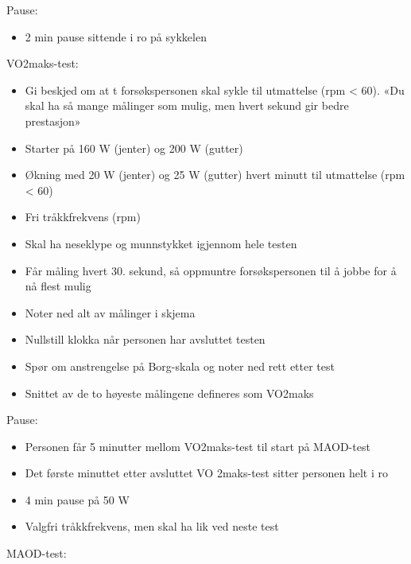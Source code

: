 \documentclass[
  letterpaper,
  DIV=11,
  numbers=noendperiod]{scrartcl}
\providecommand{\tightlist}{%
  \setlength{\itemsep}{0pt}\setlength{\parskip}{0pt}}\usepackage{longtable,booktabs,array}
\begin{document}
Pause:

\begin{itemize}
\tightlist
\item
  2 min pause sittende i ro på sykkelen
\end{itemize}

VO2maks-test:

\begin{itemize}
\tightlist
\item
  Gi beskjed om at t forsøkspersonen skal sykle til utmattelse (rpm
  \textless{} 60). «Du skal ha så mange målinger som mulig, men hvert
  sekund gir bedre prestasjon»
\item
  Starter på 160 W (jenter) og 200 W (gutter)
\item
  Økning med 20 W (jenter) og 25 W (gutter) hvert minutt til utmattelse
  (rpm \textless{} 60)
\item
  Fri tråkkfrekvens (rpm)
\item
  Skal ha neseklype og munnstykket igjennom hele testen
\item
  Får måling hvert 30. sekund, så oppmuntre forsøkspersonen til å jobbe
  for å nå flest mulig
\item
  Noter ned alt av målinger i skjema
\item
  Nullstill klokka når personen har avsluttet testen
\item
  Spør om anstrengelse på Borg-skala og noter ned rett etter test
\item
  Snittet av de to høyeste målingene defineres som VO2maks
\end{itemize}

Pause:

\begin{itemize}
\tightlist
\item
  Personen får 5 minutter mellom VO2maks-test til start på MAOD-test
\item
  Det første minuttet etter avsluttet VO 2maks-test sitter personen helt
  i ro
\item
  4 min pause på 50 W
\item
  Valgfri tråkkfrekvens, men skal ha lik ved neste test
\end{itemize}

MAOD-test:
\end{document}
